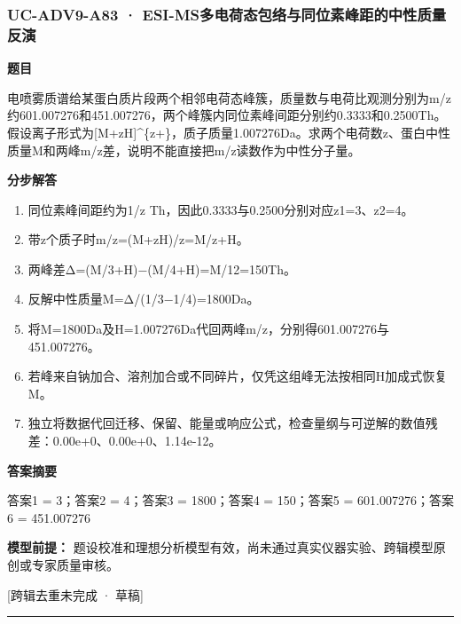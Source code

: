 \documentclass[UTF8,11pt,a4paper]{ctexart}
\begin{document}
\subsubsection*{UC-ADV9-A83 · ESI-MS多电荷态包络与同位素峰距的中性质量反演}
\noindent\textbf{题目}\par
电喷雾质谱给某蛋白质片段两个相邻电荷态峰簇，质量数与电荷比观测分别为m/z约601.007276和451.007276，两个峰簇内同位素峰间距分别约0.3333和0.2500Th。假设离子形式为[M+zH]\textasciicircum{}\{z+\}，质子质量1.007276Da。求两个电荷数z、蛋白中性质量M和两峰m/z差，说明不能直接把m/z读数作为中性分子量。\par
\medskip\noindent\textbf{分步解答}
\begin{enumerate}
\item 同位素峰间距约为1/z Th，因此0.3333与0.2500分别对应z1=3、z2=4。
\item 带z个质子时m/z=(M+zH)/z=M/z+H。
\item 两峰差Δ=(M/3+H)−(M/4+H)=M/12=150Th。
\item 反解中性质量M=Δ/(1/3−1/4)=1800Da。
\item 将M=1800Da及H=1.007276Da代回两峰m/z，分别得601.007276与451.007276。
\item 若峰来自钠加合、溶剂加合或不同碎片，仅凭这组峰无法按相同H加成式恢复M。
\item 独立将数据代回迁移、保留、能量或响应公式，检查量纲与可逆解的数值残差：0.00e+0、0.00e+0、1.14e-12。
\end{enumerate}
\noindent\textbf{答案摘要}\par
答案1 = 3；答案2 = 4；答案3 = 1800；答案4 = 150；答案5 = 601.007276；答案6 = 451.007276\par
\noindent\textbf{模型前提：}
题设校准和理想分析模型有效，尚未通过真实仪器实验、跨辑模型原创或专家质量审核。\par
\noindent\textcolor{red!65!black}{[跨辑去重未完成 · 草稿]} \par
\medskip\hrule\medskip
{}
\end{document}
